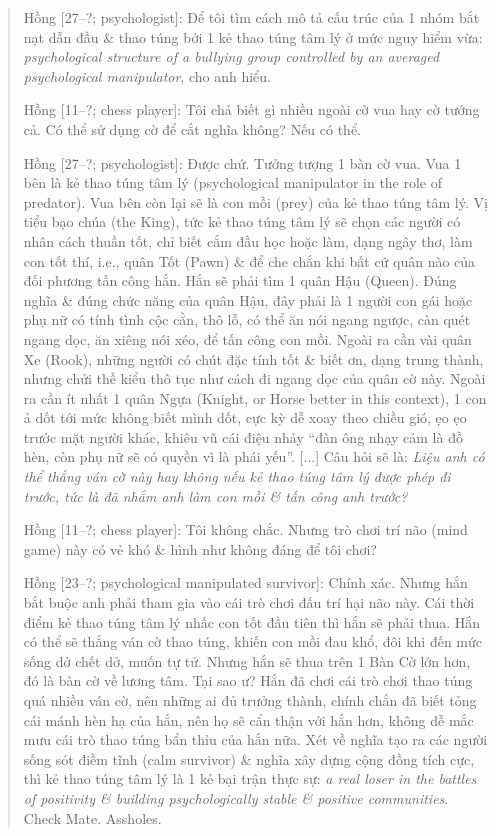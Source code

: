 \documentclass[12pt]{article}
\begin{document}
\begin{quotation}
	{\sf Hồng [27--?; psychologist]}: Để tôi tìm cách mô tả cấu trúc của 1 nhóm bắt nạt dẫn đầu \& thao túng bởi 1 kẻ thao túng tâm lý ở mức nguy hiểm vừa: {\it psychological structure of a bullying group controlled by an averaged psychological manipulator}, cho anh hiểu.
	
	{\sf Hồng [11--?; chess player]}: Tôi chả biết gì nhiều ngoài cờ vua hay cờ tướng cả. Có thể sử dụng cờ để cắt nghĩa không? Nếu có thể.
	
	{\sf Hồng [27--?; psychologist]}: Được chứ. Tưởng tượng 1 bàn cờ vua. Vua 1 bên là kẻ thao túng tâm lý (psychological manipulator in the role of predator). Vua bên còn lại sẽ là con mồi (prey) của kẻ thao túng tâm lý. Vị tiểu bạo chúa (the King), tức kẻ thao túng tâm lý sẽ chọn các người có nhân cách thuần tốt, chỉ biết cắm đầu học hoặc làm, dạng ngây thơ, làm con tốt thí, i.e., quân Tốt (Pawn) \& để che chắn khi bất cứ quân nào của đối phương tấn công hắn. Hắn sẽ phải tìm 1 quân Hậu (Queen). Đúng nghĩa \& đúng chức năng của quân Hậu, đây phải là 1 người con gái hoặc phụ nữ có tính tình cộc cằn, thô lỗ, có thể ăn nói ngang ngược, càn quét ngang dọc, ăn xiêng nói xéo, để tấn công con mồi. Ngoài ra cần vài quân Xe (Rook), những người có chút đặc tính tốt \& biết ơn, dạng trung thành, nhưng chửi thề kiểu thô tục như cách đi ngang dọc của quân cờ này. Ngoài ra cần ít nhất 1 quân Ngựa (Knight, or Horse better in this context), 1 con ả dốt tới mức không biết mình dốt, cực kỳ dễ xoay theo chiều gió, ẹo ẹo trước mặt người khác, khiêu vũ cái điệu nhảy ``đàn ông nhạy cảm là đồ hèn, còn phụ nữ sẽ có quyền vì là phái yếu''. [...] Câu hỏi sẽ là: {\it Liệu anh có thể thắng ván cờ này hay không nếu kẻ thao túng tâm lý được phép đi trước, tức là đã nhắm anh làm con mồi \& tấn công anh trước?}
	
	{\sf Hồng [11--?; chess player]}: Tôi không chắc. Nhưng trò chơi trí não (mind game) này có vẻ khó \& hình như không đáng để tôi chơi?
	
	{\sf Hồng [23--?; psychological manipulated survivor]}: Chính xác. Nhưng hắn bắt buộc anh phải tham gia vào cái trò chơi đấu trí hại não này. Cái thời điểm kẻ thao túng tâm lý nhấc con tốt đầu tiên thì hắn sẽ phải thua. Hắn có thể sẽ thắng ván cờ thao túng, khiến con mồi đau khổ, đôi khi đến mức sống dở chết dở, muốn tự tử. Nhưng hắn sẽ thua trên 1 Bàn Cờ lớn hơn, đó là bàn cờ về lương tâm. Tại sao ư? Hắn đã chơi cái trò chơi thao túng quá nhiều ván cờ, nên những ai đủ trưởng thành, chính chắn đã biết tỏng cái mánh hèn hạ của hắn, nên họ sẽ cẩn thận với hắn hơn, không dễ mắc mưu cái trò thao túng bẩn thỉu của hắn nữa. Xét về nghĩa tạo ra các người sống sót điềm tĩnh (calm survivor) \& nghĩa xây dựng cộng đồng tích cực, thì kẻ thao túng tâm lý là 1 kẻ bại trận thực sự: {\it a real loser in the battles of positivity \& building psychologically stable \& positive communities}. Check Mate. Assholes.
\end{quotation}
\end{document}
